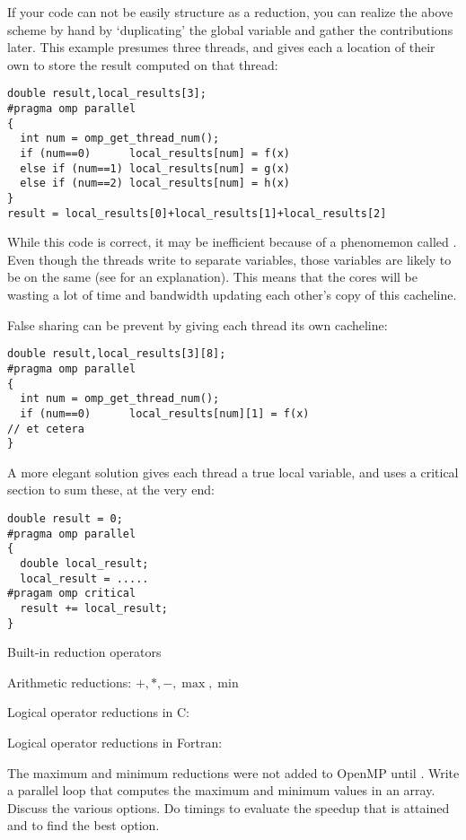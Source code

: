 If your code can not be easily structure as a reduction, you can 
realize the above scheme by hand by
`duplicating' the global variable and gather the contributions later.
This example presumes three threads, and gives each a location of their
own to store the result computed on that thread:
\begin{lstlisting}
double result,local_results[3];
#pragma omp parallel
{
  int num = omp_get_thread_num();
  if (num==0)      local_results[num] = f(x)
  else if (num==1) local_results[num] = g(x)
  else if (num==2) local_results[num] = h(x)
}
result = local_results[0]+local_results[1]+local_results[2]
\end{lstlisting}
While this code is correct, it may be inefficient because of a
phenomemon called . Even though the threads write
to separate variables, those variables are likely to be on the same 
 (see  for an explanation).
This means that the cores will be wasting a lot of time and bandwidth updating
each other's copy of this cacheline.

False sharing can be prevent by giving each thread its own cacheline:
\begin{lstlisting}
double result,local_results[3][8];
#pragma omp parallel
{
  int num = omp_get_thread_num();
  if (num==0)      local_results[num][1] = f(x)
// et cetera
}
\end{lstlisting}
A more elegant solution gives each thread a true local variable,
and uses a critical section to sum these, at the very end:
\begin{lstlisting}
double result = 0;
#pragma omp parallel
{
  double local_result;
  local_result = .....
#pragam omp critical
  result += local_result;
}
\end{lstlisting}

 {Built-in reduction operators}

Arithmetic reductions: $+,*,-,\max,\min$

Logical operator reductions in C: \n{& && | || ^}

Logical operator reductions in Fortran:

\begin{exercise}
  The maximum and minimum reductions were not added to OpenMP until
  . Write a parallel loop that computes the maximum and
  minimum values in an array. Discuss the various options. Do timings
  to evaluate the speedup that is attained and to find the best option.
\end{exercise}

